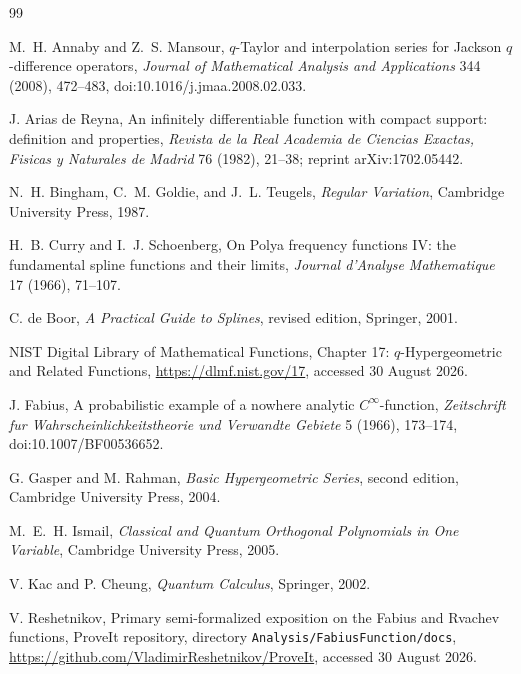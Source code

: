 \documentclass[11pt,oneside]{article}
\numberwithin{equation}{section}
\theoremstyle{definition}
\theoremstyle{remark}
\begin{document}
\begin{thebibliography}{99}

M.~H. Annaby and Z.~S. Mansour,
\newblock $q$-Taylor and interpolation series for Jackson $q$-difference
operators,
\newblock \emph{Journal of Mathematical Analysis and Applications} 344 (2008),
472--483,
\newblock doi:10.1016/j.jmaa.2008.02.033.

J. Arias de Reyna,
\newblock An infinitely differentiable function with compact support:
definition and properties,
\newblock \emph{Revista de la Real Academia de Ciencias Exactas, Fisicas y
Naturales de Madrid} 76 (1982), 21--38;
\newblock reprint arXiv:1702.05442.

N.~H. Bingham, C.~M. Goldie, and J.~L. Teugels,
\newblock \emph{Regular Variation},
\newblock Cambridge University Press, 1987.

H.~B. Curry and I.~J. Schoenberg,
\newblock On Polya frequency functions IV: the fundamental spline functions
and their limits,
\newblock \emph{Journal d'Analyse Mathematique} 17 (1966), 71--107.

C. de Boor,
\newblock \emph{A Practical Guide to Splines}, revised edition,
\newblock Springer, 2001.

NIST Digital Library of Mathematical Functions,
\newblock Chapter 17: $q$-Hypergeometric and Related Functions,
\newblock \url{https://dlmf.nist.gov/17}, accessed 30 August 2026.

J. Fabius,
\newblock A probabilistic example of a nowhere analytic $C^\infty$-function,
\newblock \emph{Zeitschrift fur Wahrscheinlichkeitstheorie und Verwandte
Gebiete} 5 (1966), 173--174,
\newblock doi:10.1007/BF00536652.

G. Gasper and M. Rahman,
\newblock \emph{Basic Hypergeometric Series}, second edition,
\newblock Cambridge University Press, 2004.

M.~E.~H. Ismail,
\newblock \emph{Classical and Quantum Orthogonal Polynomials in One Variable},
\newblock Cambridge University Press, 2005.

V. Kac and P. Cheung,
\newblock \emph{Quantum Calculus},
\newblock Springer, 2002.

V. Reshetnikov,
\newblock Primary semi-formalized exposition on the Fabius and Rvachev
functions,
\newblock ProveIt repository, directory
\texttt{Analysis/FabiusFunction/docs},
\newblock \url{https://github.com/VladimirReshetnikov/ProveIt},
accessed 30 August 2026.


\end{thebibliography}
\end{document}
